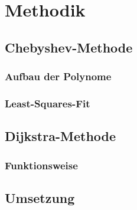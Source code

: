 \chapter{Methodik}

\section{Chebyshev-Methode}
\blindtext

\subsection{Aufbau der Polynome}
\blindtext

\subsection{Least-Squares-Fit}
\blindtext

\section{Dijkstra-Methode}
\blindtext

\subsection{Funktionsweise}
\blindtext

\section{Umsetzung}
\blindtext
